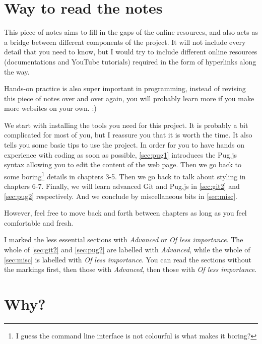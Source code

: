 \section{Way to read the notes}

This piece of notes aims to fill in the gaps of the online resources, and also acts as a bridge between different components of the project. It will not include every detail that you need to know, but I would try to include different online resources (documentations and YouTube tutorials) required in the form of hyperlinks along the way.
\vspace{6mm}

Hands-on practice is also super important in programming, instead of revising this piece of notes over and over again, you will probably learn more if you make more websites on your own. :)
\vspace{6mm}

We start with installing the tools you need for this project. It is probably a bit complicated for most of you, but I reassure you that it is worth the time. It also tells you some basic tips to use the project. In order for you to have hands on experience with coding as soon as possible, \cref{sec:pug1} introduces the Pug.js syntax allowing you to edit the content of the web page. Then we go back to some boring\footnote{I guess the command line interface is not colourful is what makes it boring?} details in chapters 3-5. Then we go back to talk about styling in chapters 6-7. Finally, we will learn advanced Git and Pug.js in \cref{sec:git2} and \cref{sec:pug2} respectively. And we conclude by miscellaneous bits in \cref{sec:misc}.
\vspace{6mm}

However, feel free to move back and forth between chapters as long as you feel comfortable and fresh. 
\vspace{6mm}

I marked the less essential sections with \textit{Advanced} or \textit{Of less importance}. The whole of \cref{sec:git2} and \cref{sec:pug2} are labelled with \textit{Advanced}, while the whole of \cref{sec:misc} is labelled with \textit{Of less importance}. You can read the sections without the markings first, then those with \textit{Advanced}, then those with \textit{Of less importance}.

\section{Why?}

